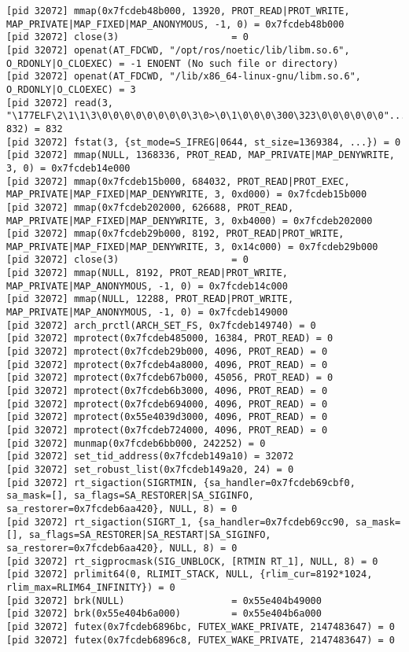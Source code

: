 \documentclass[a4paper, 14pt]{article}
\begin{document}
\begin{lstlisting}
[pid 32072] mmap(0x7fcdeb48b000, 13920, PROT_READ|PROT_WRITE, MAP_PRIVATE|MAP_FIXED|MAP_ANONYMOUS, -1, 0) = 0x7fcdeb48b000
[pid 32072] close(3)                    = 0
[pid 32072] openat(AT_FDCWD, "/opt/ros/noetic/lib/libm.so.6", O_RDONLY|O_CLOEXEC) = -1 ENOENT (No such file or directory)
[pid 32072] openat(AT_FDCWD, "/lib/x86_64-linux-gnu/libm.so.6", O_RDONLY|O_CLOEXEC) = 3
[pid 32072] read(3, "\177ELF\2\1\1\3\0\0\0\0\0\0\0\0\3\0>\0\1\0\0\0\300\323\0\0\0\0\0\0"..., 832) = 832
[pid 32072] fstat(3, {st_mode=S_IFREG|0644, st_size=1369384, ...}) = 0
[pid 32072] mmap(NULL, 1368336, PROT_READ, MAP_PRIVATE|MAP_DENYWRITE, 3, 0) = 0x7fcdeb14e000
[pid 32072] mmap(0x7fcdeb15b000, 684032, PROT_READ|PROT_EXEC, MAP_PRIVATE|MAP_FIXED|MAP_DENYWRITE, 3, 0xd000) = 0x7fcdeb15b000
[pid 32072] mmap(0x7fcdeb202000, 626688, PROT_READ, MAP_PRIVATE|MAP_FIXED|MAP_DENYWRITE, 3, 0xb4000) = 0x7fcdeb202000
[pid 32072] mmap(0x7fcdeb29b000, 8192, PROT_READ|PROT_WRITE, MAP_PRIVATE|MAP_FIXED|MAP_DENYWRITE, 3, 0x14c000) = 0x7fcdeb29b000
[pid 32072] close(3)                    = 0
[pid 32072] mmap(NULL, 8192, PROT_READ|PROT_WRITE, MAP_PRIVATE|MAP_ANONYMOUS, -1, 0) = 0x7fcdeb14c000
[pid 32072] mmap(NULL, 12288, PROT_READ|PROT_WRITE, MAP_PRIVATE|MAP_ANONYMOUS, -1, 0) = 0x7fcdeb149000
[pid 32072] arch_prctl(ARCH_SET_FS, 0x7fcdeb149740) = 0
[pid 32072] mprotect(0x7fcdeb485000, 16384, PROT_READ) = 0
[pid 32072] mprotect(0x7fcdeb29b000, 4096, PROT_READ) = 0
[pid 32072] mprotect(0x7fcdeb4a8000, 4096, PROT_READ) = 0
[pid 32072] mprotect(0x7fcdeb67b000, 45056, PROT_READ) = 0
[pid 32072] mprotect(0x7fcdeb6b3000, 4096, PROT_READ) = 0
[pid 32072] mprotect(0x7fcdeb694000, 4096, PROT_READ) = 0
[pid 32072] mprotect(0x55e4039d3000, 4096, PROT_READ) = 0
[pid 32072] mprotect(0x7fcdeb724000, 4096, PROT_READ) = 0
[pid 32072] munmap(0x7fcdeb6bb000, 242252) = 0
[pid 32072] set_tid_address(0x7fcdeb149a10) = 32072
[pid 32072] set_robust_list(0x7fcdeb149a20, 24) = 0
[pid 32072] rt_sigaction(SIGRTMIN, {sa_handler=0x7fcdeb69cbf0, sa_mask=[], sa_flags=SA_RESTORER|SA_SIGINFO, sa_restorer=0x7fcdeb6aa420}, NULL, 8) = 0
[pid 32072] rt_sigaction(SIGRT_1, {sa_handler=0x7fcdeb69cc90, sa_mask=[], sa_flags=SA_RESTORER|SA_RESTART|SA_SIGINFO, sa_restorer=0x7fcdeb6aa420}, NULL, 8) = 0
[pid 32072] rt_sigprocmask(SIG_UNBLOCK, [RTMIN RT_1], NULL, 8) = 0
[pid 32072] prlimit64(0, RLIMIT_STACK, NULL, {rlim_cur=8192*1024, rlim_max=RLIM64_INFINITY}) = 0
[pid 32072] brk(NULL)                   = 0x55e404b49000
[pid 32072] brk(0x55e404b6a000)         = 0x55e404b6a000
[pid 32072] futex(0x7fcdeb6896bc, FUTEX_WAKE_PRIVATE, 2147483647) = 0
[pid 32072] futex(0x7fcdeb6896c8, FUTEX_WAKE_PRIVATE, 2147483647) = 0

\end{lstlisting}
\end{document}
